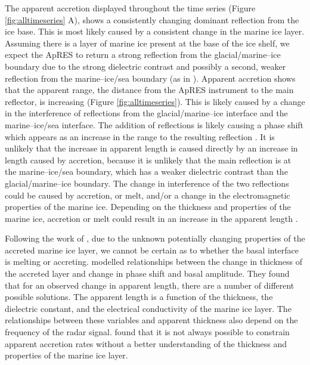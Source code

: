 The apparent accretion displayed throughout the time series (Figure \ref{fig:alltimeseries} A), shows a consistently changing dominant reflection from the ice base. This is most likely caused by a consistent change in the marine ice layer. 
Assuming there is a layer of marine ice present at the base of the ice shelf, we expect the ApRES to return a strong reflection from the glacial/marine--ice boundary due to the strong dielectric contrast and possibly a second, weaker reflection from the marine--ice/sea boundary (as in \cite{fricker2001distribution}).
Apparent accretion shows that the apparent range, the distance from the ApRES instrument to the main reflector, is increasing (Figure \ref{fig:alltimeseries}). This is likely caused by a change in the interference of reflections from the glacial/marine--ice interface and the marine--ice/sea interface. The addition of reflections is likely causing a phase shift which appears as an increase in the range to the resulting reflection \citep{vavnkova2021nature}. It is unlikely that the increase in apparent length is caused directly by an increase in length caused by accretion, because it is unlikely that the main reflection is at the marine--ice/sea boundary, which has a weaker dielectric contrast than the glacial/marine--ice boundary.
The change in interference of the two reflections could be caused by accretion, or melt, and/or a change in the electromagnetic properties of the marine ice. Depending on the thickness and properties of the marine ice, accretion or melt could result in an increase in the apparent length \citep{vavnkova2021nature}.

Following the work of \cite{vavnkova2021nature}, due to the unknown potentially changing properties of the accreted marine ice layer, we cannot be certain as to whether the basal interface is melting or accreting. 
\cite{vavnkova2021nature} modelled relationships between the change in thickness of the accreted layer and change in phase shift and basal amplitude.  They found that for an observed change in apparent length, there are a number of different possible solutions. The apparent length is a function of the thickness, the dielectric constant, and the electrical conductivity of the marine ice layer. The relationships between these variables and apparent thickness also depend on the frequency of the radar signal. \cite{vavnkova2021nature} found that it is not always possible to constrain apparent accretion rates without a better understanding of the thickness and properties of the marine ice layer.

